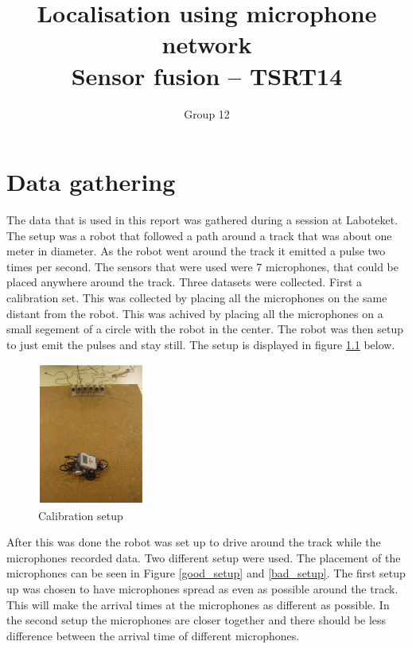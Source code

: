 \documentclass[10pt,a4paper]{report}
\begin{document}
\title{Localisation using microphone network\\Sensor fusion -- TSRT14}
\author{Group 12}
\maketitle


\tableofcontents

\newpage
\chapter{Data gathering}
\label{Data gathering}
The data that is used in this report was gathered during a session at Laboteket.
The setup was a robot that followed a path around a track that was about one meter in diameter.
As the robot went around the track it emitted a pulse two times per second.
The sensors that were used were 7 microphones, that could be placed anywhere around the track.
Three datasets were collected.
First a calibration set. This was collected by placing all the microphones on the same distant from the robot.
This was achived by placing all the microphones on a small segement of a circle with the robot in the center.
The robot was then setup to just emit the pulses and stay still. The setup is displayed in figure \ref{calibtration_setup} below.
\begin{figure}[H]
\begin{center}
  \includegraphics[width = 100pt]{calibration_setup.png}
  \caption{Calibration setup}
  \label{calibtration_setup}
  \end{center}
\end{figure}

After this was done the robot was set up to drive around the track while the microphones recorded data.
Two different setup were used. The placement of the microphones can be seen in Figure \ref{good_setup} and \ref{bad_setup}.
The first setup up was chosen to have microphones spread as even as possible around the track.
This will make the arrival times at the microphones as different as possible.
In the second setup the microphones are closer together and there should be less difference between the arrival time of different microphones.
\end{document}

